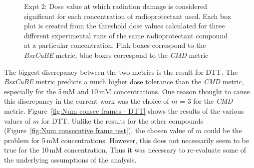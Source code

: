 \begin{figure}
\begin{subfigure}[b]{0.72\textwidth}
            \caption{}
            \label{fig:SAXS Metric comparison - 10mM}
    \end{subfigure}
    \caption[Radioprotectant efficacy comparison  boxplots for each concentration in the experiment.]{Expt 2: Dose value at which radiation damage is considered significant for each concentration of radioprotectant used. Each box plot is created from the threshold dose values calculated for three different experimental runs of the same radioprotectant compound at a particular concentration. Pink boxes correspond to the \textit{BsxCuBE} metric, blue boxes correspond to the \textit{CMD} metric}
    \label{fig:SAXS Metric comparison}
\end{figure}

The biggest discrepancy between the two metrics is the result for DTT.
The \textit{BsxCuBE} metric predicts a much higher dose tolerance than the \textit{CMD} metric, especially for the 5$\,$mM and 10$\,$mM concentrations.
One reason thought to cause this discrepancy in the current work was the choice of $m$ = 3 for the \textit{CMD} metric.
Figure~\ref{fig:Num consec frames - DTT} shows the results of the various values of $m$ for DTT.
Unlike the results for the other compounds (Figure~\ref{fig:Num consecutive frame test}), the chosen value of $m$ could be the problem for 5$\,$mM concentrations.
However, this does not necessarily seem to be true for the 10$\,$mM concentration.
Thus it was necessary to re-evaluate some of the underlying assumptions of the analysis.

